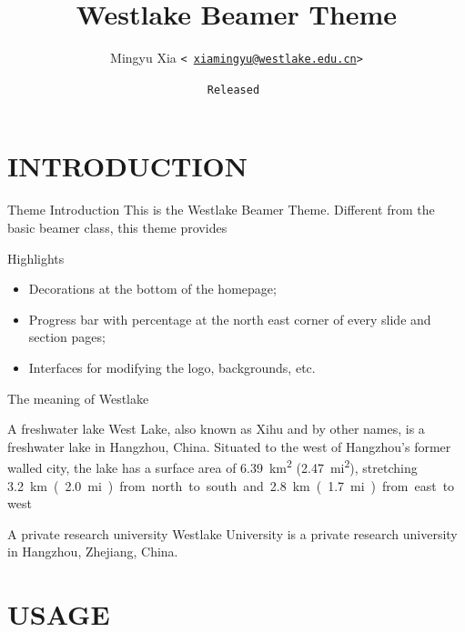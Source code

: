 \documentclass[handout, svgnames, aspectratio = 1610]{beamer}
\title[beamerthemeWestlake]{Westlake Beamer Theme}
\author[Mingyu Xia]{Mingyu Xia \texttt{<%
  \href{mailto:xiamingyu@westlake.edu.cn}{xiamingyu@westlake.edu.cn}>}}
\date{\texorpdfstring
  {\texttt{Released \westlake@date}}{Released \westlake@date}}
\providecommand \cls {\textsf}
\begin{document}
\maketitle

\section{INTRODUCTION}

\begin{frame}{Theme Introduction}
  This is the Westlake Beamer Theme.
  Different from the basic \cls{beamer} class,
  this theme provides
  \begin{alertblock}{Highlights}
    \begin{itemize}
      \item Decorations at the bottom of the homepage;
      \item Progress bar with percentage at the north east corner of
      every slide and section pages;
      \item Interfaces for modifying the logo, backgrounds, etc.
    \end{itemize}
  \end{alertblock}
  {
    The meaning of Westlake}
  \begin{exampleblock}{A freshwater lake}
    West Lake, also known as Xihu and by other names,
    is a freshwater lake in Hangzhou, China.
    Situated to the west of Hangzhou's former walled city,
    the lake has a surface area of \qty{6.39}{\km^2} (\qty{2.47}{mi^2}),\cite{1}
    stretching \qty{3.2}\km (\qty{2.0}{mi}) from north to south
    and \qty{2.8}\km (\qty{1.7}{mi}) from east to west.\cite{2}
  \end{exampleblock}
  \begin{block}{A private research university}
    Westlake University is a private research university in
    Hangzhou, Zhejiang, China.
  \end{block}
\end{frame}

\section{USAGE}
\end{document}
